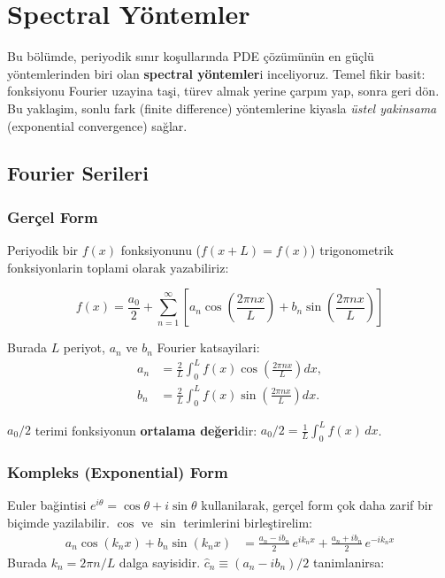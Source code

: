 \chapter{Spectral Yöntemler}
\label{ch:spectral}

Bu bölümde, periyodik sınır koşullarında PDE çözümünün en güçlü yöntemlerinden biri olan \textbf{spectral yöntemler}i inceliyoruz.
Temel fikir basit: fonksiyonu Fourier uzayina taşi, türev almak yerine çarpım yap, sonra geri dön.
Bu yaklaşim, sonlu fark (finite difference) yöntemlerine kiyasla \emph{üstel yakinsama} (exponential convergence) sağlar.


\section{Fourier Serileri}
\label{sec:fourier_serileri}

\subsection{Gerçel Form}

Periyodik bir $f(x)$ fonksiyonunu ($f(x+L) = f(x)$) trigonometrik fonksiyonlarin toplami olarak yazabiliriz:

\begin{equation}
\label{eq:fourier_reel}
f(x) = \frac{a_0}{2} + \sum_{n=1}^{\infty} \left[ a_n \cos\!\left(\frac{2\pi n x}{L}\right) + b_n \sin\!\left(\frac{2\pi n x}{L}\right) \right]
\end{equation}

Burada $L$ periyot, $a_n$ ve $b_n$ Fourier katsayilari:
\begin{align}
a_n &= \frac{2}{L} \int_0^L f(x)\cos\!\left(\frac{2\pi n x}{L}\right) dx, \label{eq:an} \\
b_n &= \frac{2}{L} \int_0^L f(x)\sin\!\left(\frac{2\pi n x}{L}\right) dx. \label{eq:bn}
\end{align}

\begin{remark}
$a_0/2$ terimi fonksiyonun \textbf{ortalama değeri}dir: $a_0/2 = \frac{1}{L}\int_0^L f(x)\,dx$.
\end{remark}

\subsection{Kompleks (Exponential) Form}

Euler bağintisi $e^{i\theta} = \cos\theta + i\sin\theta$ kullanilarak, gerçel form çok daha zarif bir biçimde yazilabilir. $\cos$ ve $\sin$ terimlerini birleştirelim:
\begin{align}
a_n\cos(k_n x) + b_n\sin(k_n x) &= \frac{a_n - ib_n}{2}\,e^{ik_n x} + \frac{a_n + ib_n}{2}\,e^{-ik_n x}
\end{align}
Burada $k_n = 2\pi n / L$ dalga sayisidir. $\hat{c}_n \equiv (a_n - ib_n)/2$ tanimlanirsa:

